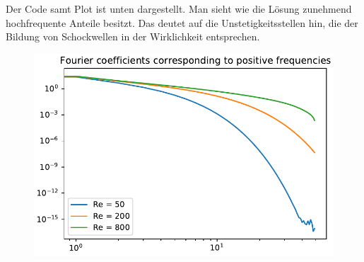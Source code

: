 \documentclass[12pt]{exam}
\begin{document}
\begin{questions}
    \begin{solution}
        Der Code samt Plot ist unten dargestellt. Man sieht wie die Lösung zunehmend hochfrequente Anteile besitzt. Das deutet auf die Unstetigkeitsstellen hin, die der Bildung von Schockwellen in der Wirklichkeit entsprechen.
    \end{solution}
    
    \begin{figure}[!htpb]
        \centering
        \includegraphics{toy_model.pdf}
        \label{fig:toymodel}
    \end{figure}
    
    \inputminted[breaklines, fontsize=\small, frame=single, linenos=true]{python}{toy_model.py}
    
\end{questions}
\end{document}
